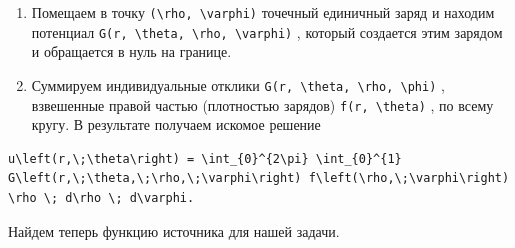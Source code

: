 \documentclass[
  ukrainian,
]{article}
\begin{document}
\begin{enumerate}
\def\labelenumi{\arabic{enumi}.}
\item
  Помещаем в точку
  \texttt{(\textbackslash{}rho,\ \textbackslash{}varphi)} точечный
  единичный заряд и находим потенциал
  \texttt{G(r,\ \textbackslash{}theta,\ \textbackslash{}rho,\ \textbackslash{}varphi)}
  , который создается этим зарядом и обращается в нуль на границе.
\item
  Суммируем индивидуальные отклики
  \texttt{G(r,\ \textbackslash{}theta,\ \textbackslash{}rho,\ \textbackslash{}phi)}
  , взвешенные правой частью (плотностью зарядов)
  \texttt{f(r,\ \textbackslash{}theta)} , по всему кругу. В результате
  получаем искомое решение
\end{enumerate}

\begin{verbatim}
u\left(r,\;\theta\right) = \int_{0}^{2\pi} \int_{0}^{1} G\left(r,\;\theta,\;\rho,\;\varphi\right) f\left(\rho,\;\varphi\right) \rho \; d\rho \; d\varphi.
\end{verbatim}

Найдем теперь функцию источника для нашей задачи.
\end{document}
